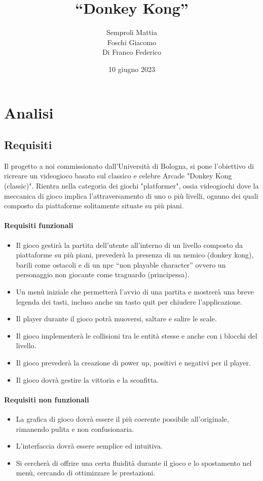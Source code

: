 \documentclass[a4paper,12pt]{report}
\title{``Donkey Kong''}
\author{Semproli Mattia \\ Foschi Giacomo \\ Di Franco Federico}
\date{10 giugno 2023}
\begin{document}
\maketitle

\tableofcontents

\chapter{Analisi}

\section{Requisiti}

Il progetto a noi commissionato dall'Università di Bologna, si pone l'obiettivo di ricreare un videogioco basato sul classico e celebre Arcade "Donkey Kong (classic)". Rientra nella categoria dei giochi "platformer", ossia videogiochi dove la meccanica di gioco implica l'attraversamento di uno o più livelli, ognuno dei quali composto da piattaforme solitamente situate su più piani.

\subsubsection{Requisiti funzionali}
\begin{itemize}
	\item Il gioco gestirà la partita dell'utente all'interno di un livello composto da piattaforme su più piani, prevederà la presenza di un nemico (donkey kong), barili come ostacoli e di un npc “non playable character” ovvero un personaggio non giocante come traguardo (principessa). 
    \item Un menù iniziale che permetterà l'avvio di una partita e mostrerà una breve legenda dei tasti, incluso anche un tasto quit per chiudere l'applicazione.
    \item Il player durante il gioco potrà muoversi, saltare e salire le scale.
    \item Il gioco implementerà le collisioni tra le entità stesse e anche con i blocchi del livello.
    \item Il gioco prevederà la creazione di power up, positivi e negativi per il player.
    \item Il gioco dovrà gestire la vittoria e la sconfitta.
\end{itemize}

\subsubsection{Requisiti non funzionali}
\begin{itemize}
	\item La grafica di gioco dovrà essere il più coerente possibile all'originale, rimanendo pulita e non confusionaria.
    \item L'interfaccia dovrà essere semplice ed intuitiva.
    \item Si cercherà di offrire una certa fluidità durante il gioco e lo spostamento nel menù, cercando di ottimizzare le prestazioni.
\end{itemize}
\end{document}
